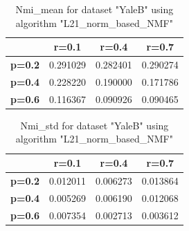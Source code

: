 \begin{table}[p]
\centering
\begin{tabular}{|c|c|c|c|}
\hline
 & \textbf{r=0.1} & \textbf{r=0.4} & \textbf{r=0.7} \\
\hline
\textbf{p=0.2} & 0.291029 & 0.282401 & 0.290274 \\
\hline
\textbf{p=0.4} & 0.228220 & 0.190000 & 0.171786 \\
\hline
\textbf{p=0.6} & 0.116367 & 0.090926 & 0.090465 \\
\hline
\end{tabular}
\caption{Nmi\_mean for dataset "YaleB" using algorithm "L21\_norm\_based\_NMF"}
\end{table}

\begin{table}[p]
\centering
\begin{tabular}{|c|c|c|c|}
\hline
 & \textbf{r=0.1} & \textbf{r=0.4} & \textbf{r=0.7} \\
\hline
\textbf{p=0.2} & 0.012011 & 0.006273 & 0.013864 \\
\hline
\textbf{p=0.4} & 0.005269 & 0.006190 & 0.012068 \\
\hline
\textbf{p=0.6} & 0.007354 & 0.002713 & 0.003612 \\
\hline
\end{tabular}
\caption{Nmi\_std for dataset "YaleB" using algorithm "L21\_norm\_based\_NMF"}
\end{table}



